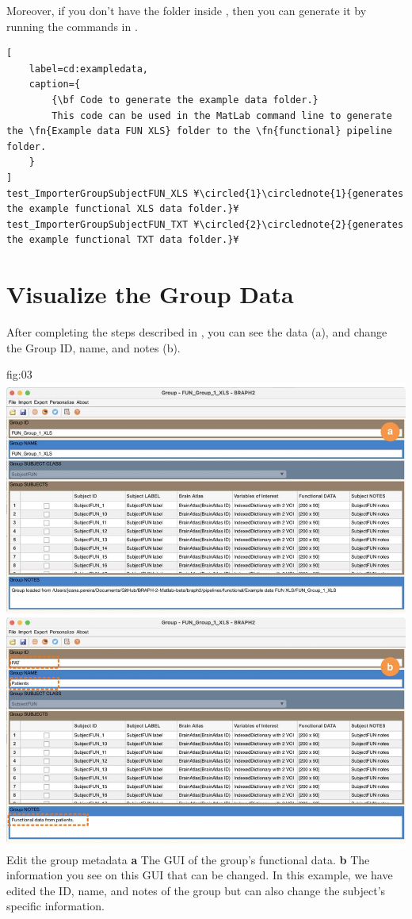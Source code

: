 \documentclass[justified]{tufte-handout}
\begin{document}
Moreover, if you don't have the  folder inside , then you can generate it by running the commands in .

\begin{lstlisting}[
	label=cd:exampledata,
	caption={
		{\bf Code to generate the example data folder.}
		This code can be used in the MatLab command line to generate the \fn{Example data FUN XLS} folder to the \fn{functional} pipeline folder.
	}
]
test_ImporterGroupSubjectFUN_XLS ¥\circled{1}\circlednote{1}{generates the example functional XLS data folder.}¥
test_ImporterGroupSubjectFUN_TXT ¥\circled{2}\circlednote{2}{generates the example functional TXT data folder.}¥
\end{lstlisting}

\section{Visualize the Group Data}

After completing the steps described in , you can see the data (a), and change the Group ID, name, and notes (b). 

	{fig:03}
	{
	\includegraphics{fig03.jpg}
	}
	{Edit the group metadata}
	{ 
	{\bf a} The GUI of the group's functional data. 
	{\bf b} The information you see on this GUI that can be changed. In this example, we have edited the ID, name, and notes of the group but can also change the subject's specific information.
	}
\end{document}
